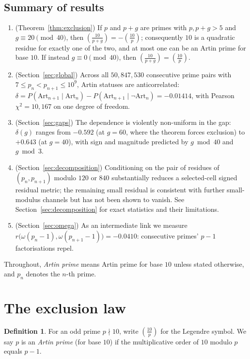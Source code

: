 \documentclass[11pt]{amsart}
\theoremstyle{definition}
\newtheorem{definition}{Definition}
\newcommand{\Lsym}[2]{\left(\tfrac{#1}{#2}\right)}
\newcommand{\Art}{\mathrm{Art}}
\begin{document}
\subsection*{Summary of results}
\begin{enumerate}
	\item (Theorem~\ref{thm:exclusion}) If $p$ and $p + g$ are primes with
	      $p, p + g > 5$ and $g \equiv 20 \pmod{40}$, then $\Lsym{10}{p+g} = -\Lsym{10}{p}$;
	      consequently $10$ is a quadratic residue for exactly one of the two, and at
	      most one can be an Artin prime for base $10$. If instead
	      $g \equiv 0 \pmod{40}$, then $\Lsym{10}{p+g} = \Lsym{10}{p}$.
	\item (Section~\ref{sec:global}) Across all $50{,}847{,}530$ consecutive
	      prime pairs with $7 \le p_n < p_{n+1} \le 10^9$, Artin statuses are
	      anticorrelated:
	      $\delta = P(\Art_{n+1} \mid \Art_n) - P(\Art_{n+1} \mid \lnot \Art_n)
		      = -0.01414$, with Pearson $\chi^2 = 10{,}167$ on one degree of freedom.
	\item (Section~\ref{sec:gaps}) The dependence is violently non-uniform in
	      the gap: $\delta(g)$ ranges from $-0.592$ (at $g = 60$, where the theorem
	      forces exclusion) to $+0.643$ (at $g = 40$), with sign and magnitude
	      predicted by $g \bmod 40$ and $g \bmod 3$.
	\item (Section~\ref{sec:decomposition}) Conditioning on the pair of residues
	      of $(p_n, p_{n+1})$ modulo $120$ or $840$ substantially reduces a
	      selected-cell signed residual metric; the remaining small residual
	      is consistent with further small-modulus channels but has not been shown to
	      vanish. See Section~\ref{sec:decomposition} for exact statistics and
	      their limitations.
	\item (Section~\ref{sec:omega}) As an intermediate link
	      we measure $r\bigl(\omega(p_n-1), \omega(p_{n+1}-1)\bigr) = -0.0410$:
	      consecutive primes' $p-1$ factorisations repel.
\end{enumerate}

Throughout, \emph{Artin prime} means Artin prime for base $10$ unless stated
otherwise, and $p_n$ denotes the $n$-th prime.

\section{The exclusion law}
\label{sec:theorem}

\begin{definition}
	For an odd prime $p \nmid 10$, write $\Lsym{10}{p}$ for the Legendre symbol.
	We say $p$ is an \emph{Artin prime} (for base $10$) if the multiplicative order
	of $10$ modulo $p$ equals $p - 1$.
\end{definition}
\end{document}
